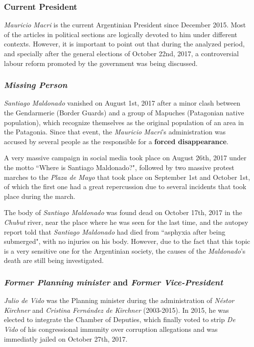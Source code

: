 \documentclass{bmcart}
\begin{document}
\subsubsection*{Current President}
\par \emph{Mauricio Macri} is the current Argentinian President since December 2015. 
Most of the articles in political sections are logically devoted to him under different contexts.
However, it is important to point out that during the analyzed period, and specially after the general elections of October 22nd, 2017, a controversial labour reform promoted by the government was being discussed.

\subsubsection*{\emph{Missing Person}}
\par \emph{Santiago Maldonado} vanished on August 1st, 2017 after a minor clash between the Gendarmerie (Border Guards) and a group of Mapuches (Patagonian native population), which recognize themselves as the original population of an area in the Patagonia.
Since that event, the \emph{Mauricio Macri}'s administration was accused by several people as the responsible for a \textbf{forced disappearance}. 
\par A very massive campaign in social media took place on August 26th, 2017 under the motto ``Where is Santiago Maldonado?", followed by two massive protest marches to the \emph{Plaza de Mayo} that took place on September 1st and October 1st, of which the first one had a great repercussion due to several incidents that took place during the march.
\par The body of \emph{Santiago Maldonado} was found dead on October 17th, 2017 in the \emph{Chubut} river, near the place where he was seen for the last time, and the autopsy report told that \emph{Santiago Maldonado} had died from ``asphyxia after being submerged", with no injuries on his body. 
However, due to the fact that this topic is a very sensitive one for the Argentinian society, the causes of the \emph{Maldonado}'s death are still being investigated.

\subsubsection*{\emph{Former Planning minister} and \emph{Former Vice-President}}

\par \emph{Julio de Vido} was the Planning minister during the administration of \emph{N\'estor Kirchner} and \emph{Cristina Fern\'andez de Kirchner} (2003-2015). In 2015, he was elected to integrate the Chamber of Deputies, which finally voted to strip \emph{De Vido} of his congressional immunity over corruption allegations and was immediatly jailed on October 27th, 2017.
\end{document}
